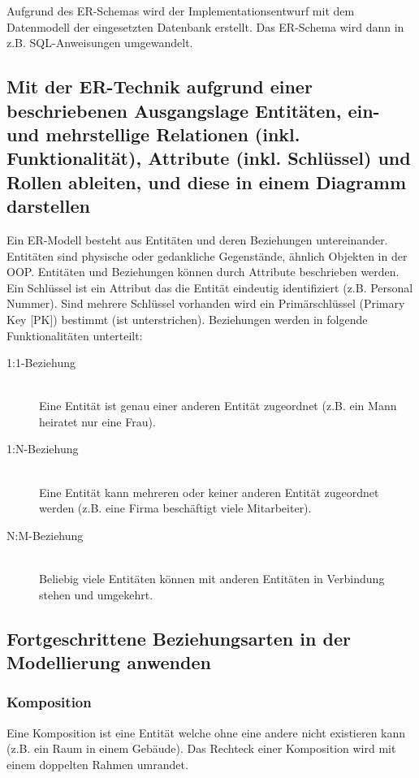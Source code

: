 Aufgrund des ER-Schemas wird der Implementationsentwurf mit dem Datenmodell der eingesetzten Datenbank erstellt. Das ER-Schema wird dann in z.B. SQL-Anweisungen umgewandelt.

\subsection{Mit der ER-Technik aufgrund einer beschriebenen Ausgangslage Entitäten, ein- und mehrstellige Relationen (inkl. Funktionalität), Attribute (inkl. Schlüssel) und Rollen ableiten, und diese in einem Diagramm darstellen}

Ein ER-Modell besteht aus Entitäten und deren Beziehungen untereinander. Entitäten sind physische oder gedankliche Gegenstände, ähnlich Objekten in der OOP. Entitäten und Beziehungen können durch Attribute beschrieben werden. Ein Schlüssel ist ein Attribut das die Entität eindeutig identifiziert (z.B. Personal Nummer). Sind mehrere Schlüssel vorhanden wird ein Primärschlüssel (Primary Key [PK]) bestimmt (ist unterstrichen). Beziehungen werden in folgende Funktionalitäten unterteilt:

\begin{description}
	\item[1:1-Beziehung] \hfill \\
		  Eine Entität ist genau einer anderen Entität zugeordnet (z.B. ein Mann heiratet nur eine Frau). 
	\item[1:N-Beziehung] \hfill \\
		  Eine Entität kann mehreren oder keiner anderen Entität zugeordnet werden (z.B. eine Firma beschäftigt viele Mitarbeiter).
	\item[N:M-Beziehung] \hfill \\
		  Beliebig viele Entitäten können mit anderen Entitäten in Verbindung stehen und umgekehrt.
\end{description}

\subsection{Fortgeschrittene Beziehungsarten in der Modellierung anwenden}

\subsubsection{Komposition}

Eine Komposition ist eine Entität welche ohne eine andere nicht existieren kann (z.B. ein Raum in einem Gebäude). Das Rechteck einer Komposition wird mit einem doppelten Rahmen umrandet. 

